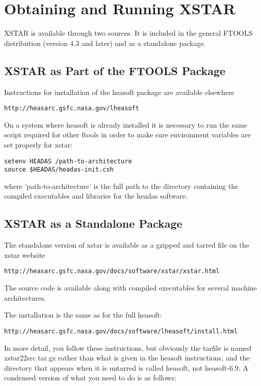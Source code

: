 \chapter{Obtaining and Running XSTAR}
\label{sec:installation}

XSTAR is available through two sources.  It is included in the 
general FTOOLS distribution (version 4.3 and later) and as a standalone package.

\section{XSTAR as Part of the FTOOLS Package}

Instructions for installation of the heasoft package are available elsewhere
\begin{verbatim} 
http://heasarc.gsfc.nasa.gov/lheasoft
\end{verbatim}
On a system where heasoft is already installed it is necessary to 
run the same script required for other ftools in order to make sure 
environment variables are set properly for xstar: 

\begin{verbatim}
setenv HEADAS /path-to-architecture
source $HEADAS/headas-init.csh
\end{verbatim}

where 'path-to-architecture' is the full path to the directory containing the compiled executables 
and libraries for the headas software.

\section{XSTAR as a Standalone Package}

The standalone version of xstar is available as a gzipped and tarred file 
on the xstar website
\begin{verbatim} 
http://heasarc.gsfc.nasa.gov/docs/software/xstar/xstar.html
\end{verbatim}
The source code is available along with compiled executables for 
several machine architectures.  

The installation is the same as for the full heasoft:

\begin{verbatim} 
http://heasarc.gsfc.nasa.gov/docs/software/lheasoft/install.html
\end{verbatim} 

In more detail, you follow these instructions, but obviously the tarfile is named xstar22src.tar.gz rather than what is given in the heasoft instructions, and the directory that appears
when it is untarred is called heasoft, not  heasoft-6.9.  A condensed version of what you need to do is as follows:

